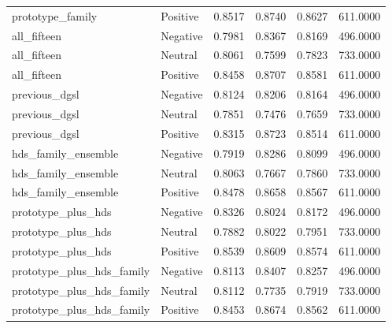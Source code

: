 \begin{tabular}{llrrrr}
prototype\_family & Positive & 0.8517 & 0.8740 & 0.8627 & 611.0000 \\
all\_fifteen & Negative & 0.7981 & 0.8367 & 0.8169 & 496.0000 \\
all\_fifteen & Neutral & 0.8061 & 0.7599 & 0.7823 & 733.0000 \\
all\_fifteen & Positive & 0.8458 & 0.8707 & 0.8581 & 611.0000 \\
previous\_dgsl & Negative & 0.8124 & 0.8206 & 0.8164 & 496.0000 \\
previous\_dgsl & Neutral & 0.7851 & 0.7476 & 0.7659 & 733.0000 \\
previous\_dgsl & Positive & 0.8315 & 0.8723 & 0.8514 & 611.0000 \\
hds\_family\_ensemble & Negative & 0.7919 & 0.8286 & 0.8099 & 496.0000 \\
hds\_family\_ensemble & Neutral & 0.8063 & 0.7667 & 0.7860 & 733.0000 \\
hds\_family\_ensemble & Positive & 0.8478 & 0.8658 & 0.8567 & 611.0000 \\
prototype\_plus\_hds & Negative & 0.8326 & 0.8024 & 0.8172 & 496.0000 \\
prototype\_plus\_hds & Neutral & 0.7882 & 0.8022 & 0.7951 & 733.0000 \\
prototype\_plus\_hds & Positive & 0.8539 & 0.8609 & 0.8574 & 611.0000 \\
prototype\_plus\_hds\_family & Negative & 0.8113 & 0.8407 & 0.8257 & 496.0000 \\
prototype\_plus\_hds\_family & Neutral & 0.8112 & 0.7735 & 0.7919 & 733.0000 \\
prototype\_plus\_hds\_family & Positive & 0.8453 & 0.8674 & 0.8562 & 611.0000 \\
\bottomrule
\end{tabular}
